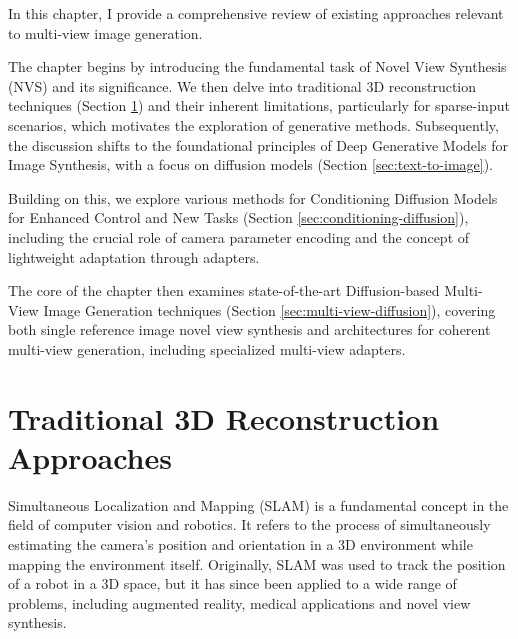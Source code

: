 \label{chapter:related}

In this chapter, I provide a comprehensive review of existing
approaches relevant to multi-view image generation.

The chapter begins by introducing the fundamental task of Novel View
Synthesis (NVS) and its significance. We then delve into traditional
3D reconstruction techniques (Section \ref{sec:3d-reconstruction})
and their inherent limitations, particularly for sparse-input
scenarios, which motivates the exploration of generative methods.
Subsequently, the discussion shifts to the foundational principles of
Deep Generative Models for Image Synthesis, with a focus on diffusion
models (Section \ref{sec:text-to-image}).

Building on this, we explore various methods for Conditioning
Diffusion Models for Enhanced Control and New Tasks (Section
\ref{sec:conditioning-diffusion}), including the crucial role of
camera parameter encoding and the concept of lightweight adaptation
through adapters.

The core of the chapter then examines state-of-the-art
Diffusion-based Multi-View Image Generation techniques (Section
\ref{sec:multi-view-diffusion}), covering both single reference image
novel view synthesis and architectures for coherent multi-view
generation, including specialized multi-view adapters.

\section{Traditional 3D Reconstruction Approaches}\label{sec:3d-reconstruction}

Simultaneous Localization and Mapping (SLAM) is a fundamental concept
in the field of computer vision and robotics. It refers to the
process of simultaneously estimating the camera's position and
orientation in a 3D environment while mapping the environment itself.
Originally, SLAM was used to track the position of a robot in a 3D
space, but it has since been applied to a wide range of problems,
including augmented reality, medical applications and novel view
synthesis.

